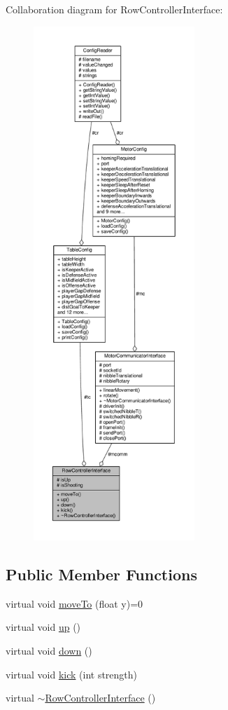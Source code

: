 Collaboration diagram for Row\+Controller\+Interface\+:\nopagebreak
\begin{figure}[H]
\begin{center}
\leavevmode
\includegraphics[height=550pt]{class_row_controller_interface__coll__graph}
\end{center}
\end{figure}
\subsection*{Public Member Functions}
\begin{DoxyCompactItemize}
\item 
virtual void \hyperlink{class_row_controller_interface_a66c9b362e84b2207a18726d8248505eb}{move\+To} (float y)=0
\item 
virtual void \hyperlink{class_row_controller_interface_ab6cc6124c349921882f9ceb6958b8845}{up} ()
\item 
virtual void \hyperlink{class_row_controller_interface_a3cde9f61b44185d92e80a5baec6a6947}{down} ()
\item 
virtual void \hyperlink{class_row_controller_interface_a7f0b6dda9e51019347f2fee14387622a}{kick} (int strength)
\item 
virtual \hyperlink{class_row_controller_interface_a09c32bf8d9d8b51b3c1118280a7b31fe}{$\sim$\+Row\+Controller\+Interface} ()
\end{DoxyCompactItemize}
